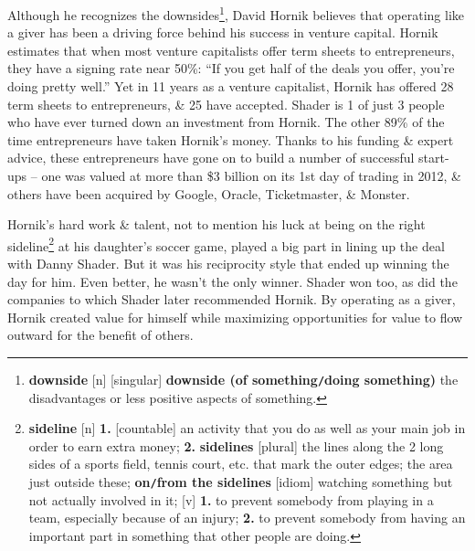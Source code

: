 \documentclass[oneside]{book}
\numberwithin{equation}{section}
\begin{document}
Although he recognizes the downsides\footnote{\textbf{downside} [n] [singular] \textbf{downside (of something\texttt{/}doing something)} the disadvantages or less positive aspects of something.}, David Hornik believes that operating like a giver has been a driving force behind his success in venture capital. Hornik estimates that when most venture capitalists offer term sheets to entrepreneurs, they have a signing rate near 50\%: ``If you get half of the deals you offer, you're doing pretty well.'' Yet in 11 years as a venture capitalist, Hornik has offered 28 term sheets to entrepreneurs, \& 25 have accepted. Shader is 1 of just 3 people who have ever turned down an investment from Hornik. The other 89\% of the time entrepreneurs have taken Hornik's money. Thanks to his funding \& expert advice, these entrepreneurs have gone on to build a number of successful start-ups -- one was valued at more than \$3 billion on its 1st day of trading in 2012, \& others have been acquired by Google, Oracle, Ticketmaster, \& Monster.

Hornik's hard work \& talent, not to mention his luck at being on the right sideline\footnote{\textbf{sideline} [n] \textbf{1.} [countable] an activity that you do as well as your main job in order to earn extra money; \textbf{2.} \textbf{sidelines} [plural] the lines along the 2 long sides of a sports field, tennis court, etc. that mark the outer edges; the area just outside these; \textbf{on\texttt{/}from the sidelines} [idiom] watching something but not actually involved in it; [v] \textbf{1.} to prevent somebody from playing in a team, especially because of an injury; \textbf{2.} to prevent somebody from having an important part in something that other people are doing.} at his daughter's soccer game, played a big part in lining up the deal with Danny Shader. But it was his reciprocity style that ended up winning the day for him. Even better, he wasn't the only winner. Shader won too, as did the companies to which Shader later recommended Hornik. By operating as a giver, Hornik created value for himself while maximizing opportunities for value to flow outward for the benefit of others.\\
\end{document}
